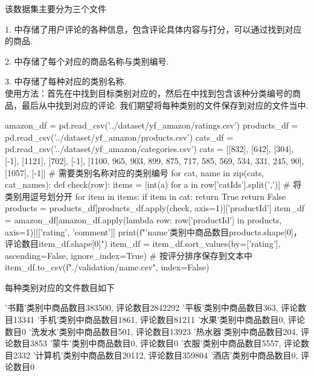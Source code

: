 \documentclass[12pt, a4paper, oneside]{ctexart}
\numberwithin{equation}{section}  %
\begin{document}
该数据集主要分为三个文件

1. 中存储了用户评论的各种信息，包含评论具体内容与打分，可以通过找到对应的商品.

2. 中存储了每个对应的商品名称与类别编号.

3. 中存储了每种对应的类别名称.
\\
使用方法：首先在中找到目标类别对应的，然后在中找到包含该种分类编号的商品，最后从中找到对应的评论. 我们期望将每种类别的文件保存到对应的文件当中.

\begin{pythoncode}
amazon_df = pd.read_csv('../dataset/yf_amazon/ratings.csv')
products_df = pd.read_csv('../dataset/yf_amazon/products.csv')
cats_df = pd.read_csv('../dataset/yf_amazon/categories.csv')
cats = [[832], [642], [304], [-1], [1121], [702], [-1],
        [1100, 965, 903, 899, 875, 717, 585, 569, 534, 331, 245, 90], [1057], [-1]]  # 需要类别名称对应的类别编号
for cat, name in zip(cats, cat_names):
    def check(row):
        items = [int(a) for a in row['catIds'].split(',')]  # 将类别用逗号划分开
        for item in items:
            if item in cat:
                return True
        return False
    products = products_df[products_df.apply(check, axis=1)]['productId']
    item_df = amazon_df[amazon_df.apply(lambda row: row['productId'] in products, axis=1)][['rating', 'comment']]
    print(f"'{name}'类别中商品数目{products.shape[0]}，评论数目{item_df.shape[0]}")
    item_df = item_df.sort_values(by=['rating'], ascending=False, ignore_index=True)  # 按评分排序保存到文本中
    item_df.to_csv(f"./validation/{name}.csv", index=False)
\end{pythoncode}

每种类别对应的文件数目如下
\begin{pythoncode}
'书籍'类别中商品数目383500, 评论数目2842292
'平板'类别中商品数目363, 评论数目13341
'手机'类别中商品数目1861, 评论数目81211
'水果'类别中商品数目0, 评论数目0
'洗发水'类别中商品数目501, 评论数目13923
'热水器'类别中商品数目204, 评论数目3853
'蒙牛'类别中商品数目0, 评论数目0
'衣服'类别中商品数目5557, 评论数目2332
'计算机'类别中商品数目20112, 评论数目359804
'酒店'类别中商品数目0, 评论数目0
\end{pythoncode}
\end{document}
